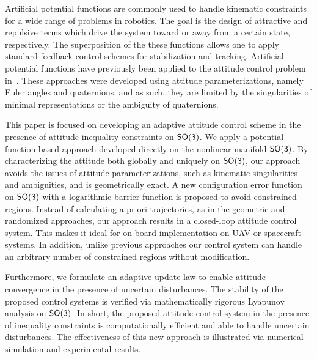 \documentclass[letterpaper, 10 pt, conference]{ieeeconf}  %
\begin{document}
Artificial potential functions are commonly used to handle kinematic constraints for a wide range of problems in robotics.
The goal is the design of attractive and repulsive terms which drive the system toward or away from a certain state, respectively.
The superposition of the these functions allows one to apply standard feedback control schemes for stabilization and tracking.
Artificial potential functions have previously been applied to the attitude control problem in~\cite{lee2011b,mcinnes1994}.
These approaches were developed using attitude parameterizations, namely Euler angles and quaternions, and as such, they are limited by the singularities of minimal representations or the ambiguity of quaternions.





This paper is focused on developing an adaptive attitude control scheme in the presence of attitude inequality constraints on \(\mathsf{SO(3)}\).
We apply a potential function based approach developed directly on the nonlinear manifold \(\mathsf{SO(3)}\). 
By characterizing the attitude both globally and uniquely on \(\mathsf{SO(3)}\), our approach avoids the issues of attitude parameterizations, such as kinematic singularities and ambiguities, and is geometrically exact. 
A new configuration error function on \(\mathsf{SO(3)}\) with a logarithmic barrier function is proposed to avoid constrained regions. 
Instead of calculating a priori trajectories, as in the geometric and randomized approaches, our approach results in a closed-loop attitude control system. 
This makes it ideal for on-board implementation on UAV or spacecraft systems. 
In addition, unlike previous approaches our control system can handle an arbitrary number of constrained regions without modification.

Furthermore, we formulate an adaptive update law to enable attitude convergence in the presence of uncertain disturbances. 
The stability of the proposed control systems is verified via mathematically rigorous Lyapunov analysis on $\mathsf{SO(3)}$.  
In short, the proposed attitude control system in the presence of inequality constraints is computationally efficient and able to handle uncertain disturbances. 
The effectiveness of this new approach is illustrated via numerical simulation and experimental results.%
\end{document}
